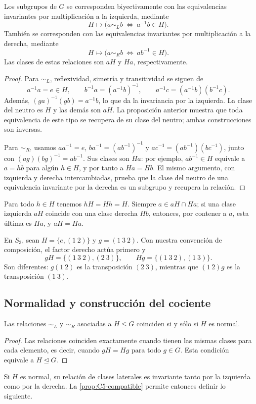 \begin{prop}\label{prop:C5-correspondencias}
Los subgrupos de $G$ se corresponden biyectivamente con las equivalencias invariantes por multiplicación a la izquierda, mediante
\[
H\longmapsto\bigl(a\sim_L b\ \Longleftrightarrow\ a^{-1}b\in H\bigr).
\]
También se corresponden con las equivalencias invariantes por multiplicación a la derecha, mediante
\[
H\longmapsto\bigl(a\sim_R b\ \Longleftrightarrow\ ab^{-1}\in H\bigr).
\]
Las clases de estas relaciones son $aH$ y $Ha$, respectivamente.
\end{prop}
\begin{proof}
Para $\sim_L$, reflexividad, simetría y transitividad se siguen de
\[
a^{-1}a=e\in H,\qquad
b^{-1}a=(a^{-1}b)^{-1},\qquad
a^{-1}c=(a^{-1}b)(b^{-1}c).
\]
Además, $(ga)^{-1}(gb)=a^{-1}b$, lo que da la invariancia por la izquierda. La clase del neutro es $H$ y las demás son $aH$. La proposición anterior muestra que toda equivalencia de este tipo se recupera de su clase del neutro; ambas construcciones son inversas.

Para $\sim_R$, usamos $aa^{-1}=e$, $ba^{-1}=(ab^{-1})^{-1}$ y $ac^{-1}=(ab^{-1})(bc^{-1})$, junto con $(ag)(bg)^{-1}=ab^{-1}$. Sus clases son $Ha$: por ejemplo, $ab^{-1}\in H$ equivale a $a=hb$ para algún $h\in H$, y por tanto a $Ha=Hb$. El mismo argumento, con izquierda y derecha intercambiadas, prueba que la clase del neutro de una equivalencia invariante por la derecha es un subgrupo y recupera la relación.
\end{proof}
Para todo $h\in H$ tenemos $hH=Hh=H$. Siempre $a\in aH\cap Ha$; si una clase izquierda $aH$ coincide con una clase derecha $Hb$, entonces, por contener a $a$, esta última es $Ha$, y $aH=Ha$.

\begin{ejem}\label{ejem:C5-S3}
En $S_3$, sean $H=\{e,(1\ 2)\}$ y $g=(1\ 3\ 2)$. Con nuestra convención de composición, el factor derecho actúa primero y
\[
gH=\{(1\ 3\ 2),(2\ 3)\},\qquad
Hg=\{(1\ 3\ 2),(1\ 3)\}.
\]
Son diferentes: $g(1\ 2)$ es la transposición $(2\ 3)$, mientras que $(1\ 2)g$ es la transposición $(1\ 3)$.
\end{ejem}

\subsection{Normalidad y construcción del cociente}\label{tema:5-2-2}
\begin{prop}\label{prop:C5-normal-relaciones}
Las relaciones $\sim_L$ y $\sim_R$ asociadas a $H\le G$ coinciden si y sólo si $H$ es normal.
\end{prop}
\begin{proof}
Las relaciones coinciden exactamente cuando tienen las mismas clases para cada elemento, es decir, cuando $gH=Hg$ para todo $g\in G$. Esta condición equivale a $H\trianglelefteq G$.
\end{proof}
Si $H$ es normal, su relación de clases laterales es invariante tanto por la izquierda como por la derecha. La \cref{prop:C5-compatible} permite entonces definir lo siguiente.

